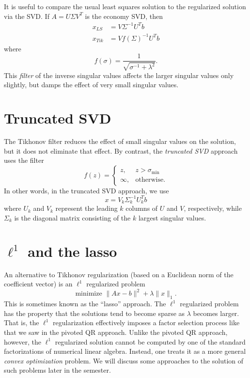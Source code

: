 \documentclass[12pt, leqno]{article}
\begin{document}
It is useful to compare the usual least squares solution to the
regularized solution via the SVD.  If $A = U \Sigma V^T$ is the
economy SVD, then
\begin{align*}
  x_{LS} &= V \Sigma^{-1} U^T b \\
  x_{Tik} &= V f(\Sigma)^{-1} U^T b
\end{align*}
where
\[
  f(\sigma) = \frac{1}{\sqrt{\sigma^{-1} + \lambda^2}}.
\]
This {\em filter} of the inverse singular values affects the larger
singular values only slightly, but damps the effect of very small
singular values.

\section{Truncated SVD}

The Tikhonov filter reduces the effect of small singular values on
the solution, but it does not eliminate that effect.  By contrast,
the {\em truncated SVD} approach uses the filter
\[
f(z) =
\begin{cases}
  z, & z > \sigma_{\min} \\
  \infty, & \mbox{otherwise}.
\end{cases}
\]
In other words, in the truncated SVD approach, we use
\[
  x = V_k \Sigma_k^{-1} U_k^T b
\]
where $U_k$ and $V_k$ represent the leading $k$ columns of $U$ and
$V$, respectively, while $\Sigma_k$ is the diagonal matrix consisting
of the $k$ largest singular values.

\section{$\ell^1$ and the lasso}

An alternative to Tikhonov regularization (based on a Euclidean norm
of the coefficient vector) is an $\ell^1$ regularized problem
\[
  \mbox{minimize } \|Ax-b\|^2 + \lambda \|x\|_1.
\]
This is sometimes known as the ``lasso'' approach.  The $\ell^1$
regularized problem has the property that the solutions tend to
become sparse as $\lambda$ becomes larger.  That is, the $\ell^1$
regularization effectively imposes a factor selection process like
that we saw in the pivoted QR approach.  Unlike the pivoted QR
approach, however, the $\ell^1$ regularized solution cannot be
computed by one of the standard factorizations of numerical linear
algebra.  Instead, one treats it as a more general {\em convex
  optimization} problem.  We will discuss some approaches to the
solution of such problems later in the semester.
\end{document}
